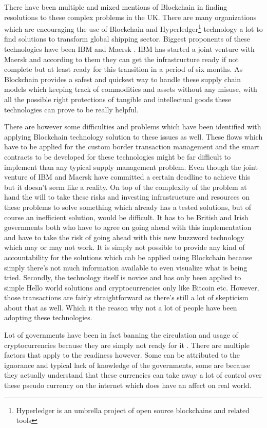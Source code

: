 There have been multiple and mixed mentions of Blockchain in finding resolutions to these complex problems in the UK. There are many organizations which are encouraging the use of Blockchain and Hyperledger\footnote{Hyperledger is an umbrella project of open source blockchains and related tools} technology a lot to find solutions to transform global shipping sector. Biggest proponents of these technologies have been IBM and Maersk \cite{stratfor1}.  IBM has started a joint venture with Maersk and according to them they can get the infrastructure ready if not complete but at least ready for this transition in a period of six months. As Blockchain provides a safest and quickest way to handle these supply chain models which keeping track of commodities and assets without any misuse, with all the possible right protections of tangible and intellectual goods these technologies can prove to be really helpful.

There are however some difficulties and problems which have been identified with applying Blockchain technology solution to these issues as well. These flows which have to be applied for the custom border transaction management and the smart contracts to be developed for these technologies might be far difficult to implement than any typical supply management problem. Even though the joint venture of IBM and Maersk have committed a certain deadline to achieve this but it doesn't seem like a reality. On top of the complexity of the problem at hand the will to take these risks and investing infrastructure and resources on these problems to solve something which already has a tested solutions, but of course an inefficient solution, would be difficult. It has to be British and Irish governments both who have to agree on going ahead with this implementation and have to take the risk of going ahead with this new buzzword technology which may or may not work. It is simply not possible to provide any kind of accountability for the solutions which cab be applied using Blockchain because simply there's not much information available to even visualize what is being tried. Secondly, the technology itself is novice and has only been applied to simple Hello world solutions and cryptocurrencies only like Bitcoin etc. However, those transactions are fairly straightforward as there's still a lot of skepticism about that as well. Which it the reason why not a lot of people have been adopting these technologies.

Lot of governments have been in fact banning the circulation and usage of cryptocurrencies because they are simply not ready for it \cite{kate2}. There are multiple factors that apply to the readiness however. Some can be attributed to the ignorance and typical lack of knowledge of the governments, some are because they actually understand that these currencies can take away a lot of control over these pseudo currency on the internet which does have an affect on real world.

